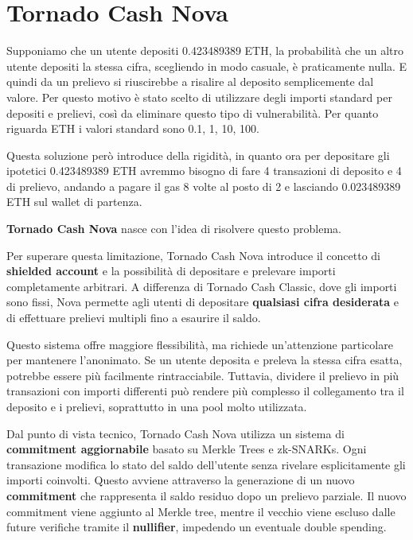 \section{Tornado Cash Nova}

Supponiamo che un utente depositi 0.423489389 ETH, la probabilità che un altro utente depositi la stessa cifra, scegliendo in modo casuale, è praticamente nulla. E quindi da un prelievo si riuscirebbe a risalire al deposito semplicemente dal valore. Per questo motivo è stato scelto di utilizzare degli importi standard per depositi e prelievi, così da eliminare questo tipo di vulnerabilità. Per quanto riguarda ETH i valori standard sono 0.1, 1, 10, 100.

Questa soluzione però introduce della rigidità, in quanto ora per depositare gli ipotetici 0.423489389 ETH avremmo bisogno di fare 4 transazioni di deposito e 4 di prelievo, andando a pagare il gas 8 volte al posto di 2 e lasciando 0.023489389 ETH sul wallet di partenza.

\textbf{Tornado Cash Nova} nasce con l'idea di risolvere questo problema.

Per superare questa limitazione, Tornado Cash Nova introduce il concetto di \textbf{shielded account} e la possibilità di depositare e prelevare importi completamente arbitrari. A differenza di Tornado Cash Classic, dove gli importi sono fissi, Nova permette agli utenti di depositare \textbf{qualsiasi cifra desiderata} e di effettuare prelievi multipli fino a esaurire il saldo.

Questo sistema offre maggiore flessibilità, ma richiede un'attenzione particolare per mantenere l'anonimato. Se un utente deposita e preleva la stessa cifra esatta, potrebbe essere più facilmente rintracciabile. Tuttavia, dividere il prelievo in più transazioni con importi differenti può rendere più complesso il collegamento tra il deposito e i prelievi, soprattutto in una pool molto utilizzata.

Dal punto di vista tecnico, Tornado Cash Nova utilizza un sistema di \textbf{commitment aggiornabile} basato su Merkle Trees e zk-SNARKs. Ogni transazione modifica lo stato del saldo dell'utente senza rivelare esplicitamente gli importi coinvolti. Questo avviene attraverso la generazione di un nuovo \textbf{commitment} che rappresenta il saldo residuo dopo un prelievo parziale. Il nuovo commitment viene aggiunto al Merkle tree, mentre il vecchio viene escluso dalle future verifiche tramite il \textbf{nullifier}, impedendo un eventuale double spending.

